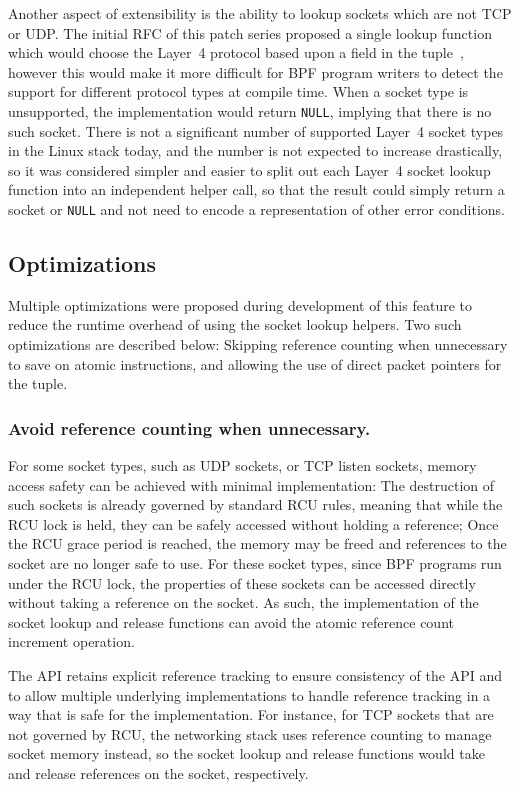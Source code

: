 \documentclass[10pt,sigconf,authorversion]{lpc}
\begin{document}
Another aspect of extensibility is the ability to lookup sockets which are not
TCP or UDP. The initial RFC of this patch series proposed a single lookup
function which would choose the Layer~4 protocol based upon a field in the
tuple~\cite{sk-lookup-rfc}, however this would make it more difficult for BPF
program writers to detect the support for different protocol types at compile
time. When a socket type is unsupported, the implementation would return
\verb+NULL+, implying that there is no such socket. There is not a significant
number of supported Layer~4 socket types in the Linux stack today, and the
number is not expected to increase drastically, so it was considered simpler
and easier to split out each Layer~4 socket lookup function into an independent
helper call, so that the result could simply return a socket or \verb+NULL+ and
not need to encode a representation of other error conditions.

\subsection{Optimizations}

Multiple optimizations were proposed during development of this feature to
reduce the runtime overhead of using the socket lookup helpers. Two such
optimizations are described below: Skipping reference counting when unnecessary
to save on atomic instructions, and allowing the use of direct packet pointers
for the tuple.

\subsubsection{Avoid reference counting when unnecessary.}

For some socket types, such as UDP sockets, or TCP listen sockets, memory
access safety can be achieved with minimal implementation: The destruction of
such sockets is already governed by standard RCU rules, meaning that while the
RCU lock is held, they can be safely accessed without holding a reference; Once
the RCU grace period is reached, the memory may be freed and references to the
socket are no longer safe to use. For these socket types, since BPF programs
run under the RCU lock, the properties of these sockets can be accessed
directly without taking a reference on the socket. As such, the implementation
of the socket lookup and release functions can avoid the atomic reference count
increment operation.

The API retains explicit reference tracking to ensure consistency of the API
and to allow multiple underlying implementations to handle reference tracking
in a way that is safe for the implementation. For instance, for  TCP sockets
that are not governed by RCU, the networking stack uses reference counting to
manage socket memory instead, so the socket lookup and release functions would
take and release references on the socket, respectively.
\end{document}
